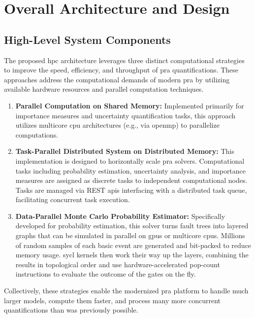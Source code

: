 \chapter{Overall Architecture and Design}
\section{High-Level System Components}

The proposed \acrshort{hpc} architecture leverages three distinct computational strategies to improve the speed, efficiency, and throughput of \acrshort{pra} quantifications. These approaches address the computational demands of modern \acrshort{pra} by utilizing available hardware resources and parallel computation techniques.

\begin{enumerate}

    \item \textbf{Parallel Computation on Shared Memory:} Implemented primarily for importance measures and uncertainty quantification tasks, this approach utilizes multicore \acrshort{cpu} architectures (e.g., via \acrshort{openmp}) to parallelize computations.
    
    \item \textbf{Task-Parallel Distributed System on Distributed Memory:} This implementation is designed to horizontally scale \acrshort{pra} solvers. Computational tasks including probability estimation, uncertainty analysis, and importance measures are assigned as discrete tasks to independent computational nodes. Tasks are managed via REST \acrshort{api}s interfacing with a distributed task queue, facilitating concurrent task execution.
    
    \item \textbf{Data-Parallel Monte Carlo Probability Estimator:} Specifically developed for probability estimation, this solver turns fault trees into layered graphs that can be simulated in parallel on \acrshort{gpu}s or multicore \acrshort{cpu}s. Millions of random samples of each basic event are generated and bit-packed to reduce memory usage. \acrshort{sycl} kernels then work their way up the layers, combining the results in topological order and use hardware-accelerated pop-count instructions to evaluate the outcome of the gates on the fly.
\end{enumerate}

Collectively, these strategies enable the modernized \acrshort{pra} platform to handle much larger models, compute them faster, and process many more concurrent quantifications than was previously possible.

